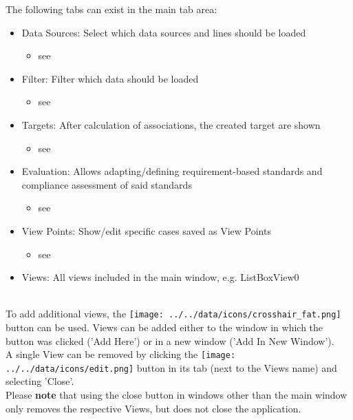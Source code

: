 The following tabs can exist in the main tab area:
\begin{itemize}
 \item Data Sources: Select which data sources and lines should be loaded
  \begin{itemize}
 \item see 
 \end{itemize}
 \item Filter: Filter which data should be loaded
   \begin{itemize}
 \item see 
 \end{itemize}
  \item Targets: After calculation of associations, the created target are shown
 \begin{itemize}
 \item see 
 \end{itemize}
 \item Evaluation: Allows adapting/defining requirement-based standards and compliance assessment of said standards
 \begin{itemize}
 \item see 
 \end{itemize}
 \item View Points: Show/edit specific cases saved as View Points
  \begin{itemize}
 \item see 
 \end{itemize}
 \item Views: All views included in the main window, e.g. ListBoxView0
\end{itemize}
\  \\

To add additional views, the \texttt{[image: ../../data/icons/crosshair\_fat.png]} button can be used. 
Views can be added either to the window in which the button was clicked ('Add Here') or in a new window ('Add In New Window'). \\

A single View can be removed by clicking the \texttt{[image: ../../data/icons/edit.png]} button in its tab (next to the Views name) and selecting 'Close'. \\

Please \textbf{note} that using the close button in windows other than the main window only removes the respective Views, but does not close the application.

